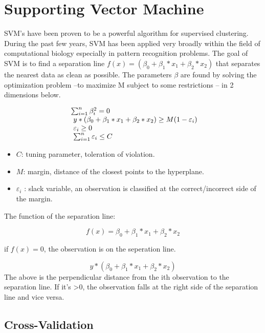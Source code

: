 \documentclass[10pt,letterpaper]{article}
\providecommand{\tightlist}{%
  \setlength{\itemsep}{0pt}\setlength{\parskip}{0pt}}
\begin{document}
\section{Supporting Vector Machine}\label{supporting-vector-machine}

SVM's have been proven to be a powerful algorithm for supervised
clustering. During the past few years, SVM has been applied very broadly
within the field of computational biology especially in pattern
recognition problems. The goal of SVM is to find a separation line
\(f(x) = (\beta_0 + \beta_1 * x_1 + \beta_2 * x_2)\) that separates the
nearest data as clean as possible. The parameters \(\beta\) are found by
solving the optimization problem --to maximize M subject to some
restrictions -- in 2 dimensions below.

\begin{equation}
  \left.
  \begin{array}{l@{\,}l}
     \sum_{i=1}^n \beta_i^2 = 0 \\
     \ y * ( \beta_0 + \beta_1 * x_1 + \beta_2 * x_2 ) \geq M(1-\varepsilon_i) \\
     \ \varepsilon_i \geq 0 \\
     \ \sum_{i=1}^n \varepsilon_i \leq C \\
  \end{array}
  \right.
\end{equation}

\begin{itemize}
\tightlist
\item
  \(C\): tuning parameter, toleration of violation.
\item
  \(M\): margin, distance of the closest points to the hyperplane.
\item
  \(\varepsilon_i\) : slack variable, an observation is classified at
  the correct/incorrect side of the margin.
\end{itemize}

The function of the separation line:

\[f(x) = \beta_0 + \beta_1 * x_1 + \beta_2 * x_2 \]

if \(f(x) = 0\), the observation is on the seperation line.

\[ y * ( \beta_0 + \beta_1 * x_1 + \beta_2 * x_2 )\] The above is the
perpendicular distance from the ith observation to the separation line.
If it's \textgreater{}0, the observation falls at the right side of the
separation line and vice versa.

\subsection{Cross-Validation}\label{cross-validation}
\end{document}
